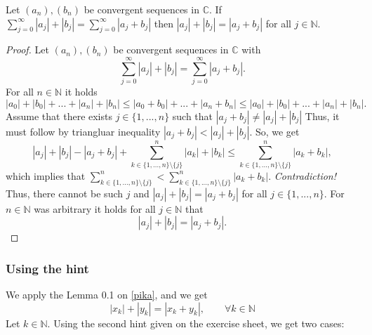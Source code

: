\documentclass[a4paper]{article}
\begin{document}
\begin{lemma}{}{}
Let $(a_n),(b_n)$ be convergent sequences in $\mathbb C$. If $\sum^\infty_{j=0}|a_j| + |b_j| = \sum^\infty_{j=0}|a_j+b_j|$ then $|a_j| + |b_j| = |a_j + b_j|$ for all $j \in \mathbb N$.
\end{lemma}
\begin{proof}
Let $(a_n),(b_n)$ be convergent sequences in $\mathbb C$ with $$\sum^\infty_{j=0}|a_j| + |b_j| = \sum^\infty_{j=0}|a_j+b_j|.$$ For all $n \in \mathbb N$ it holds
\[
    |a_0| + |b_0| + ... + |a_n| + |b_n| \leq |a_0+b_0| + ... + |a_n+b_n| \leq |a_0| + |b_0| + ... + |a_n| + |b_n|.
\]  
Assume that there exists $j \in \{ 1,...,n \}$ such that $|a_j+b_j| \neq |a_j| + |b_j|$ Thus, it must follow by triangluar inequality $|a_j+b_j| < |a_j| + |b_j|$. So, we get
\[
    |a_j| + |b_j| - |a_j + b_j| + \sum^n_{k \in \{ 1,...,n\} \setminus \{j \}} |a_k| + |b_k| \leq \sum^n_{k \in \{ 1,...,n\} \setminus \{j \}} |a_k + b_k|, 
\]
which implies that $\sum^n_{k \in \{ 1,...,n\} \setminus \{j \}} < \sum^n_{k \in \{ 1,...,n\} \setminus \{j \}} |a_k + b_k|$. \emph{Contradiction!} Thus, there cannot be such $j$ and $|a_j| + |b_j| = |a_j+b_j|$ for all $j \in \{1,...,n\}$. For $n \in \mathbb N$ was arbitrary it holds for all $j \in \mathbb N$ that
\[
    |a_j| + |b_j| = |a_j+b_j|.
\]
\end{proof}

\subsubsection*{Using the hint}
We apply the Lemma 0.1 on \eqref{pika}, and we get $$|x_k| + |y_k| = |x_k + y_k|, \qquad \forall k \in \mathbb N$$
Let $k \in \mathbb N$. Using the second hint given on the exercise sheet, we get two cases:
\end{document}
